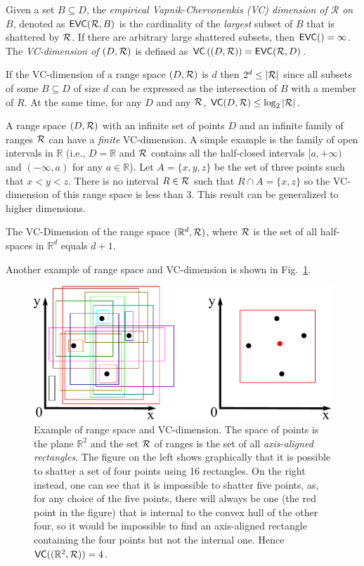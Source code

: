 \begin{definition}\label{def:vcdim}
  Given a set $B\subseteq D$, the \emph{empirical Vapnik-Chervonenkis (VC)
  dimension of $\mathcal{R}$ on $B$}, denoted as $\mathsf{EVC}(\mathcal{R},B)$ is the
  cardinality of the \emph{largest} subset of $B$ that is shattered by $\mathcal{R}$. If
  there are arbitrary large shattered subsets, then $\mathsf{EVC}()=\infty$. The
  \emph{VC-dimension of $(D,\mathcal{R})$} is defined as
  $\mathsf{VC}\left((D,\mathcal{R})\right)=\mathsf{EVC}(\mathcal{R},D)$.
\end{definition}

If the VC-dimension of a range space $(D,\mathcal{R})$ is $d$ then $2^d\leq |\mathcal{R}|$
since all subsets of some $B\subseteq D$ of size $d$ can be expressed as the
intersection of $B$ with a member of $R$. At the same time, for any $D$ and any
$\mathcal{R}$, $\mathsf{VC}(D,\mathcal{R})\le \log_2|\mathcal{R}|$.

A range space $(D,\mathcal{R})$ with an infinite set of points $D$ and
an infinite family of ranges $\mathcal{R}$ can have a \emph{finite} VC-dimension. A simple
example is the family of open intervals in $\mathbb{R}$ (i.e., $D=\mathbb{R}$ and $\mathcal{R}$
contains all the half-closed intervals $[a,+\infty)$ and $(-\infty, a)$ for any
$a\in\mathbb{R}$). Let $A=\{x,y,z\}$ be the set of three points such that
$x<y<z$. There is no interval $R\in\mathcal{R}$ such that $R\cap A=\{x,z\}$ so the
VC-dimension of this range space is less than 3. This result can be generalized
to higher dimensions.  
\begin{lemma}\label{lem:matousek} The
  VC-Dimension of the range
  space $(\mathbb{R}^d, \mathcal{R})$, where $\mathcal{R}$ is the set of all half-spaces
  in $\mathbb{R}^d$ equals $d+1$.
\end{lemma}
Another example of range space and VC-dimension is shown in Fig.~\ref{fig:rectangles}.

\begin{figure}[ht]
  \centering
  \includegraphics[width=.75\textwidth,keepaspectratio]{prelims/rectangles}
  \caption{Example of range space and VC-dimension. The space of points is the
  plane $\mathbb{R}^2$ and the set $\mathcal{R}$ of ranges is the set of all
  \emph{axis-aligned rectangles}. The figure on the left shows graphically that
  it is possible to shatter a set of four points using 16 rectangles. On the
  right instead, one can see that it is impossible to shatter five points, as,
  for any choice of the five points, there will always be one (the red point in
  the figure) that is internal to the convex hull of the other four, so it would
  be impossible to find an axis-aligned rectangle containing the four points
  but not the internal one. Hence $\mathsf{VC}((\mathbb{R}^2,\mathcal{R}))=4$.}
  \label{fig:rectangles}
\end{figure}

